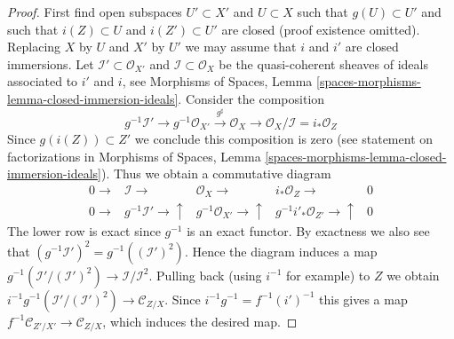 \begin{proof}
First find open subspaces $U' \subset X'$ and $U \subset X$ such that
$g(U) \subset U'$ and such that $i(Z) \subset U$ and $i(Z') \subset U'$
are closed (proof existence omitted). Replacing $X$ by $U$ and $X'$ by
$U'$ we may assume that $i$ and $i'$ are closed immersions.
Let $\mathcal{I}' \subset \mathcal{O}_{X'}$ and
$\mathcal{I} \subset \mathcal{O}_X$ be the quasi-coherent sheaves of
ideals associated to $i'$ and $i$, see
Morphisms of Spaces, Lemma \ref{spaces-morphisms-lemma-closed-immersion-ideals}.
Consider the composition
$$
g^{-1}\mathcal{I}' \to g^{-1}\mathcal{O}_{X'}
\xrightarrow{g^\sharp} \mathcal{O}_X \to
\mathcal{O}_X/\mathcal{I} = i_*\mathcal{O}_Z
$$
Since $g(i(Z)) \subset Z'$ we conclude this composition is zero (see
statement on factorizations in
Morphisms of Spaces,
Lemma \ref{spaces-morphisms-lemma-closed-immersion-ideals}).
Thus we obtain a commutative diagram
$$
\begin{array}{ccccc}0 \longrightarrow & \mathcal{I} \longrightarrow & \mathcal{O}_X \longrightarrow & i_*\mathcal{O}_Z \longrightarrow & 0 \\ 0 \longrightarrow & g^{-1}\mathcal{I}' \longrightarrow\uparrow & g^{-1}\mathcal{O}_{X'} \longrightarrow\uparrow & g^{-1}i'_*\mathcal{O}_{Z'} \longrightarrow\uparrow & 0\end{array}
$$
The lower row is exact since $g^{-1}$ is an exact functor.
By exactness we also see that
$(g^{-1}\mathcal{I}')^2 = g^{-1}((\mathcal{I}')^2)$.
Hence the diagram induces a map
$g^{-1}(\mathcal{I}'/(\mathcal{I}')^2) \to \mathcal{I}/\mathcal{I}^2$.
Pulling back (using $i^{-1}$ for example) to $Z$ we obtain
$i^{-1}g^{-1}(\mathcal{I}'/(\mathcal{I}')^2) \to \mathcal{C}_{Z/X}$.
Since $i^{-1}g^{-1} = f^{-1}(i')^{-1}$ this gives a map
$f^{-1}\mathcal{C}_{Z'/X'} \to \mathcal{C}_{Z/X}$, which induces
the desired map.
\end{proof}

